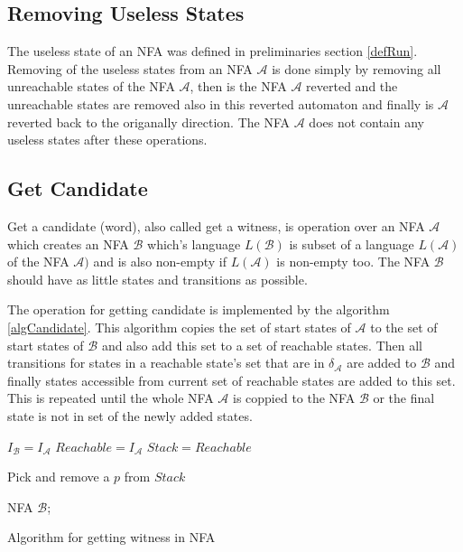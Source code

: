 \subsection{Removing Useless States}
The useless state of an NFA was defined in preliminaries section \ref{defRun}. Removing of the useless states from an NFA $\mathcal{A}$ is done simply by
removing all unreachable states of the NFA $\mathcal{A}$, 
then is the NFA $\mathcal{A}$ reverted and the unreachable states are removed also in this reverted automaton and finally is $\mathcal{A}$ reverted back to the
origanally direction. The NFA $\mathcal{A}$ does not contain any useless states after these operations.

\subsection{Get Candidate}
Get a candidate (word), also called get a witness, is operation over an NFA $\mathcal{A}$ which creates an NFA $\mathcal{B}$ which's language $L(\mathcal{B})$
is subset of a language $L(\mathcal{A})$ of the NFA $\mathcal{A})$ and is also non-empty if $L(\mathcal{A})$ is non-empty too.
The NFA $\mathcal{B}$ should have as little states and transitions as possible.

The operation for getting candidate is implemented by the algorithm \ref{algCandidate}. 
This algorithm copies the set of start states of $\mathcal{A}$ to the set of start
states of $\mathcal{B}$ and also add this set to a set of reachable states. Then all transitions for states in a reachable state's set 
that are in $\delta_\mathcal{A}$ are added to $\mathcal{B}$ and finally
states accessible from current set of reachable states are added to this set. This is repeated until the whole NFA $\mathcal{A}$ is coppied to the NFA 
$\mathcal{B}$ or the final state is not in set of the newly added states. 
\\

\begin{algorithm}[H]
	\label{algCandidate}



  $I_\mathcal{B} = I_\mathcal{A}$\;
  $Reachable = I_\mathcal{A}$\;
  $Stack = Reachable$\;
	
   {
			Pick and remove a $p$ from $Stack$\;
	}

	\Return NFA $\mathcal{B}$;
	\caption{Algorithm for getting witness in NFA}
\end{algorithm}



